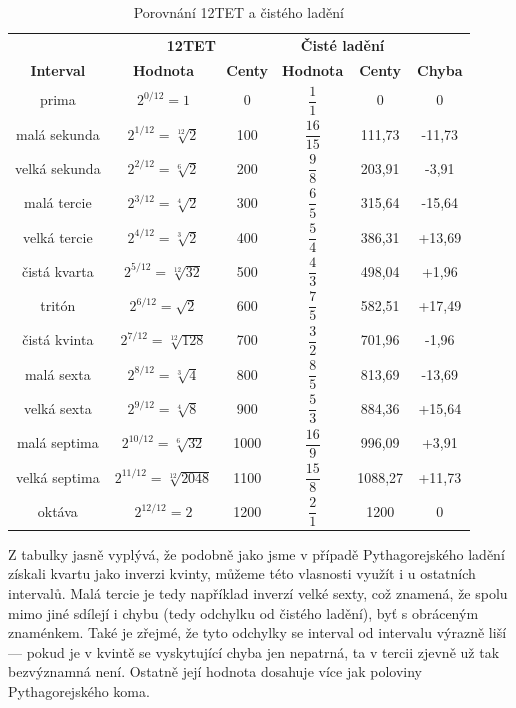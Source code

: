 \documentclass[12pt]{article}
\begin{document}
\begin{table}[p]\centering
	\begin{tabular}{ c c c c c c}
		& \multicolumn{2}{c}{\textbf{12TET}} & \multicolumn{2}{c}{\textbf{Čisté ladění}} & \\
		\textbf{Interval} & \textbf{Hodnota} & \textbf{Centy} & \textbf{Hodnota} & \textbf{Centy} & \textbf{Chyba}  \\ \hline
		prima & $2^{0/12} = 1$ & 0 & $\dfrac{1}{1}$ & 0 & 0 \\
		malá sekunda & $2^{1/12} = \sqrt[12]{2}$ & 100 & $\dfrac{16}{15}$ & 111,73 & -11,73 \\
		velká sekunda & $2^{2/12} = \sqrt[6]{2}$ & 200 & $\dfrac{9}{8}$ & 203,91 & -3,91 \\
		malá tercie & $2^{3/12} = \sqrt[4]{2}$ & 300 & $\dfrac{6}{5}$ & 315,64 & -15,64 \\
		velká tercie & $2^{4/12} = \sqrt[3]{2}$ & 400 & $\dfrac{5}{4}$ & 386,31& +13,69 \\
		čistá kvarta & $2^{5/12} = \sqrt[12]{32}$ & 500 & $\dfrac{4}{3}$ & 498,04 & +1,96 \\
		tritón & $2^{6/12} = \sqrt{2}$ & 600 & $\dfrac{7}{5}$ & 582,51 & +17,49 \\
		čistá kvinta & $2^{7/12} = \sqrt[12]{128}$ & 700 & $\dfrac{3}{2}$ & 701,96 & -1,96 \\
		malá sexta & $2^{8/12} = \sqrt[3]{4}$ & 800 & $\dfrac{8}{5}$ & 813,69 & -13,69 \\
		velká sexta & $2^{9/12} = \sqrt[4]{8}$ & 900 & $\dfrac{5}{3}$ & 884,36 & +15,64 \\
		malá septima & $2^{10/12} = \sqrt[6]{32}$ & 1000 & $\dfrac{16}{9}$ & 996,09 & +3,91 \\
		velká septima & $2^{11/12} = \sqrt[12]{2048}$ & 1100 & $\dfrac{15}{8}$ & 1088,27 & +11,73 \\
		oktáva & $2^{12/12} = 2$ & 1200 & $\dfrac{2}{1}$ & 1200 & 0 \\
	\end{tabular}
	\caption{Porovnání 12TET a čistého ladění}
	\label{tbl:12tet_just_comparison}
\end{table}

Z tabulky jasně vyplývá, že podobně jako jsme v případě Pythagorejského ladění získali kvartu jako inverzi kvinty, můžeme této vlasnosti využít i u ostatních intervalů. Malá tercie je tedy například inverzí velké sexty, což znamená, že spolu mimo jiné sdílejí i chybu (tedy odchylku od čistého ladění), byť s obráceným znaménkem. Také je zřejmé, že tyto odchylky se interval od intervalu výrazně liší — pokud je v kvintě se vyskytující chyba jen nepatrná, ta v tercii zjevně už tak bezvýznamná není. Ostatně její hodnota dosahuje více jak poloviny Pythagorejského koma.
\end{document}
